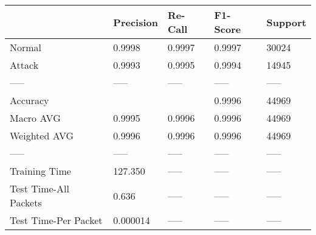 \begin{tabular}{lllll}
\toprule
{} & Precision & Re-Call & F1-Score & Support \\
\midrule
Normal                &    0.9998 &  0.9997 &   0.9997 &   30024 \\
Attack                &    0.9993 &  0.9995 &   0.9994 &   14945 \\
-----                 &     ----- &   ----- &    ----- &   ----- \\
Accuracy              &           &         &   0.9996 &   44969 \\
Macro AVG             &    0.9995 &  0.9996 &   0.9996 &   44969 \\
Weighted AVG          &    0.9996 &  0.9996 &   0.9996 &   44969 \\
-----                 &     ----- &   ----- &    ----- &   ----- \\
Training Time         &   127.350 &   ----- &    ----- &   ----- \\
Test Time-All Packets &     0.636 &   ----- &    ----- &   ----- \\
Test Time-Per Packet  &  0.000014 &   ----- &    ----- &   ----- \\
\bottomrule
\end{tabular}
